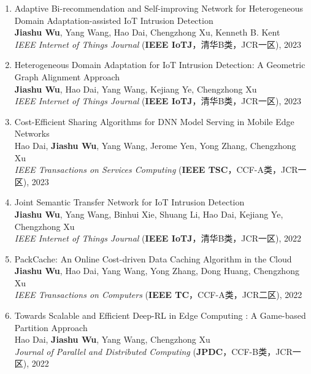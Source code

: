 \documentclass[UTF8,letterpaper,11pt]{article}
\begin{document}
\begin{enumerate}
  \item Adaptive Bi-recommendation and Self-improving Network for Heterogeneous Domain Adaptation-assisted IoT Intrusion Detection\\
  \textbf{Jiashu Wu}, Yang Wang\textsuperscript{\Letter}, Hao Dai, Chengzhong Xu, Kenneth B. Kent\\
  \textit{IEEE Internet of Things Journal} (\textbf{IEEE IoTJ}，清华B类，JCR一区), 2023

  \item Heterogeneous Domain Adaptation for IoT Intrusion Detection: A Geometric Graph Alignment Approach\\
  \textbf{Jiashu Wu}, Hao Dai, Yang Wang\textsuperscript{\Letter}, Kejiang Ye, Chengzhong Xu\\
  \textit{IEEE Internet of Things Journal} (\textbf{IEEE IoTJ}，清华B类，JCR一区), 2023

  \item Cost-Efficient Sharing Algorithms for DNN Model Serving in Mobile Edge Networks\\
  Hao Dai, \textbf{Jiashu Wu}, Yang Wang\textsuperscript{\Letter}, Jerome Yen, Yong Zhang, Chengzhong Xu\\
  \textit{IEEE Transactions on Services Computing} (\textbf{IEEE TSC}，CCF-A类，JCR一区), 2023

  \item Joint Semantic Transfer Network for IoT Intrusion Detection\\
  \textbf{Jiashu Wu}, Yang Wang\textsuperscript{\Letter}, Binhui Xie, Shuang Li, Hao Dai, Kejiang Ye, Chengzhong Xu\\
  \textit{IEEE Internet of Things Journal} (\textbf{IEEE IoTJ}，清华B类，JCR一区), 2022

  \item PackCache: An Online Cost-driven Data Caching Algorithm in the Cloud\\
  \textbf{Jiashu Wu}, Hao Dai, Yang Wang\textsuperscript{\Letter}, Yong Zhang, Dong Huang, Chengzhong Xu\\
  \textit{IEEE Transactions on Computers} (\textbf{IEEE TC}，CCF-A类，JCR二区), 2022

  \item Towards Scalable and Efficient Deep-RL in Edge Computing : A Game-based Partition Approach\\
  Hao Dai, \textbf{Jiashu Wu}, Yang Wang\textsuperscript{\Letter}, Chengzhong Xu\\
  \textit{Journal of Parallel and Distributed Computing} (\textbf{JPDC}，CCF-B类，JCR一区), 2022


\end{enumerate}
\end{document}
